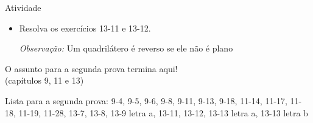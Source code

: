 \begin{frame}{Atividade}
    \begin{itemize}
        \item Resolva os exercícios 13-11 e 13-12.

            \textit{Observação:} Um quadrilátero é reverso se ele não é plano
    \end{itemize}

    \vspace{1cm}
    \begin{center}
        \Large{O assunto para a segunda prova termina aqui! \\ (capítulos 9, 11 e 13)}
    \end{center}
    \vspace{1cm}
    Lista para a segunda prova: 9-4, 9-5, 9-6, 9-8, 9-11, 9-13, 9-18, 
    11-14, 11-17, 11-18, 11-19, 11-28, 
    13-7, 13-8, 13-9 letra a, 13-11, 13-12, 13-13 letra a, 13-13 letra b
\end{frame}
